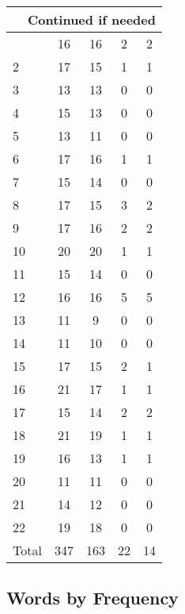 \begin{center}
\begin{longtable}{l|c|c|c|c}
\hline \multicolumn{5}{|r|}{{Continued if needed}} \\ \hline
\endfoot 
1 & 16 & 16 & 2 & 2\\ \hline
2 & 17 & 15 & 1 & 1\\ \hline
3 & 13 & 13 & 0 & 0\\ \hline
4 & 15 & 13 & 0 & 0\\ \hline
5 & 13 & 11 & 0 & 0\\ \hline
6 & 17 & 16 & 1 & 1\\ \hline
7 & 15 & 14 & 0 & 0\\ \hline
8 & 17 & 15 & 3 & 2\\ \hline
9 & 17 & 16 & 2 & 2\\ \hline
10 & 20 & 20 & 1 & 1\\ \hline
11 & 15 & 14 & 0 & 0\\ \hline
12 & 16 & 16 & 5 & 5\\ \hline
13 & 11 & 9 & 0 & 0\\ \hline
14 & 11 & 10 & 0 & 0\\ \hline
15 & 17 & 15 & 2 & 1\\ \hline
16 & 21 & 17 & 1 & 1\\ \hline
17 & 15 & 14 & 2 & 2\\ \hline
18 & 21 & 19 & 1 & 1\\ \hline
19 & 16 & 13 & 1 & 1\\ \hline
20 & 11 & 11 & 0 & 0\\ \hline
21 & 14 & 12 & 0 & 0\\ \hline
22 & 19 & 18 & 0 & 0\\ \hline
\hline \hline
Total & 347 & 163 & 22 & 14



\end{longtable}
\end{center}

 
\subsection{Words by Frequency}

